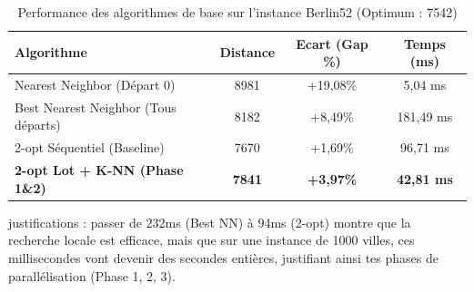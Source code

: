 \begin{table}[h]
\centering
\begin{tabular}{|l|c|c|c|}
\hline
\textbf{Algorithme} & \textbf{Distance} & \textbf{Ecart (Gap \%)} & \textbf{Temps (ms)} \\ \hline
Nearest Neighbor (Départ 0) & 8981 & +19,08\% & 5,04 ms \\ \hline
Best Nearest Neighbor (Tous départs) & 8182 & +8,49\% & 181,49 ms \\ \hline
2-opt Séquentiel (Baseline) & 7670 & +1,69\% & 96,71 ms \\ \hline
\textbf{2-opt Lot + K-NN (Phase 1\&2)} & \textbf{7841} & \textbf{+3,97\%} & \textbf{42,81 ms} \\ \hline
\end{tabular}
\caption{Performance des algorithmes de base sur l'instance Berlin52 (Optimum : 7542)}
\label{tab:baseline_berlin52}
\end{table}


justifications : 
 passer de 232ms (Best NN) à 94ms (2-opt) montre que la recherche locale est efficace, mais que sur une 
 instance de 1000 villes, ces millisecondes vont devenir des secondes entières, justifiant ainsi tes phases 
 de parallélisation (Phase 1, 2, 3). 